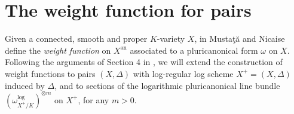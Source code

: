 \documentclass{amsart}%
\numberwithin{equation}{subsection}
\theoremstyle{plain2}
\newtheorem{prop}[equation]{Proposition}
\theoremstyle{definition2}
\theoremstyle{stepstyle}
\theoremstyle{point}
\theoremstyle{subpoint}
\newcommand{\N}{\ensuremath{\mathbb{N}}}
\newcommand{\cX}{\ensuremath{\mathscr{X}}}
\newcommand{\caC}{\ensuremath{\mathcal{C}}}
\newcommand{\cY}{\ensuremath{\mathscr{Y}}}
\newcommand{\cZ}{\ensuremath{\mathscr{Z}}}
\renewcommand{\cZ}{\ensuremath{\mathscr{Z}}}
\renewcommand{\cY}{\ensuremath{\mathscr{Y}}}
\newcommand{\an}{\mathrm{an}}
\newcommand{\Sk}{\mathrm{Sk}}
\begin{document}
%


\section{The weight function for pairs} \label{sect wt log}

Given a connected, smooth and proper $K$-variety $X$, in \cite{MustataNicaise} Musta\c{t}\u{a} and Nicaise define the \textit{weight function} on $X^\an$ associated to a pluricanonical form $\omega$ on $X$. Following the arguments of Section 4 in \cite{MustataNicaise}, we will extend the construction of weight functions to pairs $(X,\Delta)$ with log-regular log scheme $X^+=(X,\Delta)$ induced by $\Delta$, and to sections of the logarithmic pluricanonical line bundle $(\omega^{\log}_{X^+/K})^{\otimes m}$ on $X^+$, for any $m>0$.
\end{document}

